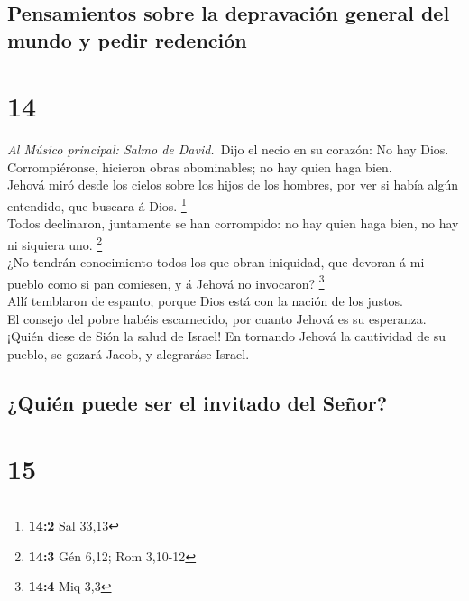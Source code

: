 \hypertarget{pensamientos-sobre-la-depravaciuxf3n-general-del-mundo-y-pedir-redenciuxf3n}{%
\subsection{Pensamientos sobre la depravación general del mundo y pedir
redención}\label{pensamientos-sobre-la-depravaciuxf3n-general-del-mundo-y-pedir-redenciuxf3n}}

\hypertarget{section-13}{%
\section{14}\label{section-13}}

 \emph{Al Músico principal: Salmo de David.}~Dijo el necio
en su corazón: No hay Dios. Corrompiéronse, hicieron obras abominables;
no hay quien haga bien.\\
 Jehová miró desde los cielos sobre los hijos de los
hombres, por ver si había algún entendido, que buscara á Dios.
\footnote{\textbf{14:2} Sal 33,13}\\
 Todos declinaron, juntamente se han corrompido: no hay
quien haga bien, no hay ni siquiera uno. \footnote{\textbf{14:3} Gén
  6,12; Rom 3,10-12}\\
 ¿No tendrán conocimiento todos los que obran iniquidad, que
devoran á mi pueblo como si pan comiesen, y á Jehová no invocaron?
\footnote{\textbf{14:4} Miq 3,3}\\
 Allí temblaron de espanto; porque Dios está con la nación
de los justos.\\
 El consejo del pobre habéis escarnecido, por cuanto Jehová
es su esperanza.\\
 ¡Quién diese de Sión la salud de Israel! En tornando Jehová
la cautividad de su pueblo, se gozará Jacob, y alegraráse Israel.

\hypertarget{quiuxe9n-puede-ser-el-invitado-del-seuxf1or}{%
\subsection{¿Quién puede ser el invitado del
Señor?}\label{quiuxe9n-puede-ser-el-invitado-del-seuxf1or}}

\hypertarget{section-14}{%
\section{15}\label{section-14}}


